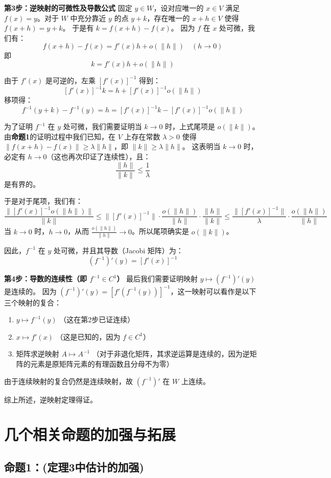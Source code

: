 \documentclass[12pt,a4paper]{ctexart}
\begin{document}
\textbf{第3步：逆映射的可微性及导数公式}
固定 $y \in W$，设对应唯一的 $x \in V$ 满足 $f(x) = y$。对于 $W$ 中充分靠近 $y$ 的点 $y + k$，存在唯一的 $x + h \in V$ 使得 $f(x + h) = y + k$。
于是有 $k = f(x + h) - f(x)$。
因为 $f$ 在 $x$ 处可微，我们有：
\[
f(x + h) - f(x) = f'(x)h + o(\|h\|) \quad (h \to 0)
\]
即
\[
k = f'(x)h + o(\|h\|)
\]

由于 $f'(x)$ 是可逆的，左乘 $[f'(x)]^{-1}$ 得到：
\[
[f'(x)]^{-1}k = h + [f'(x)]^{-1}o(\|h\|)
\]
移项得：
\[
f^{-1}(y + k) - f^{-1}(y) = h = [f'(x)]^{-1}k - [f'(x)]^{-1}o(\|h\|)
\]

为了证明 $f^{-1}$ 在 $y$ 处可微，我们需要证明当 $k \to 0$ 时，上式尾项是 $o(\|k\|)$。
由\textbf{命题1}的证明过程中我们已知，在 $V$ 上存在常数 $\lambda > 0$ 使得 $\|f(x + h) - f(x)\| \ge \lambda \|h\|$，即 $\|k\| \ge \lambda \|h\|$。
这表明当 $k \to 0$ 时，必定有 $h \to 0$（这也再次印证了连续性），且：
\[
\frac{\|h\|}{\|k\|} \le \frac{1}{\lambda}
\]
是有界的。

于是对于尾项，我们有：
\[
\frac{\|[f'(x)]^{-1}o(\|h\|)\|}{\|k\|} \le \|[f'(x)]^{-1}\| \cdot \frac{o(\|h\|)}{\|h\|} \cdot \frac{\|h\|}{\|k\|} \le \frac{\|[f'(x)]^{-1}\|}{\lambda} \cdot \frac{o(\|h\|)}{\|h\|}
\]
当 $k \to 0$ 时，$h \to 0$，从而 $\frac{o(\|h\|)}{\|h\|} \to 0$。所以尾项确实是 $o(\|k\|)$。

因此，$f^{-1}$ 在 $y$ 处可微，并且其导数（Jacobi 矩阵）为：
\[
(f^{-1})'(y) = [f'(x)]^{-1}
\]

\textbf{第4步：导数的连续性（即 $f^{-1} \in C^1$）}
最后我们需要证明映射 $y \mapsto (f^{-1})'(y)$ 是连续的。
因为 $(f^{-1})'(y) = [f'(f^{-1}(y))]^{-1}$，这一映射可以看作是以下三个映射的复合：
\begin{enumerate}[label=\arabic*.,leftmargin=2.5em]
\item $y \mapsto f^{-1}(y)$ （这在第2步已证连续）
\item $x \mapsto f'(x)$ （这是已知的，因为 $f \in C^1$）
\item 矩阵求逆映射 $A \mapsto A^{-1}$ （对于非退化矩阵，其求逆运算是连续的，因为逆矩阵的元素是原矩阵元素的有理函数且分母不为零）
\end{enumerate}
由于连续映射的复合仍然是连续映射，故 $(f^{-1})'$ 在 $W$ 上连续。

综上所述，逆映射定理得证。

\section*{几个相关命题的加强与拓展}
\subsection*{命题1：(定理3中估计的加强)}
\end{document}
